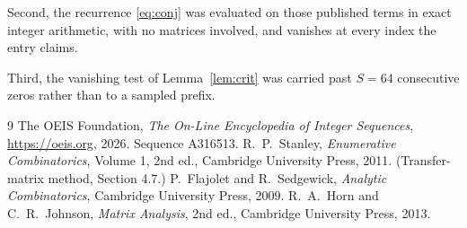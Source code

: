 \documentclass[11pt,a4paper]{article}
\theoremstyle{plain}
\theoremstyle{definition}
\begin{document}
Second, the recurrence \eqref{eq:conj} was evaluated on those published terms in exact
integer arithmetic, with no matrices involved, and vanishes at every index the entry claims.

Third, the vanishing test of Lemma~\ref{lem:crit} was carried past $S=64$ consecutive
zeros rather than to a sampled prefix.

\begin{thebibliography}{9}
 The OEIS Foundation, \emph{The On-Line Encyclopedia of Integer
Sequences}, \url{https://oeis.org}, 2026. Sequence A316513.
 R.~P.~Stanley, \emph{Enumerative Combinatorics}, Volume 1, 2nd ed.,
Cambridge University Press, 2011. (Transfer-matrix method, Section 4.7.)
 P.~Flajolet and R.~Sedgewick, \emph{Analytic Combinatorics}, Cambridge
University Press, 2009.
 R.~A.~Horn and C.~R.~Johnson, \emph{Matrix Analysis}, 2nd ed., Cambridge
University Press, 2013.
\end{thebibliography}
\end{document}
